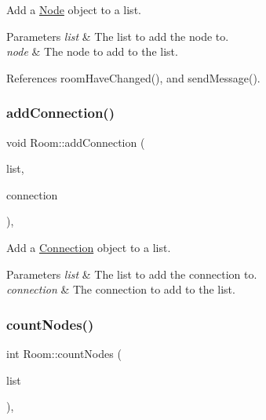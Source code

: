 Add a \mbox{\hyperlink{classNode}{Node}} object to a list. 


\begin{DoxyParams}{Parameters}
{\em list} & The list to add the node to. \\
\hline
{\em node} & The node to add to the list. \\
\hline
\end{DoxyParams}


References room\+Have\+Changed(), and send\+Message().

\mbox{\label{classRoom_a2ebf6e0a7870458f767a15a458e7e033}} 
\subsubsection{\texorpdfstring{add\+Connection()}{addConnection()}}
{\footnotesize\ttfamily void Room\+::add\+Connection (\begin{DoxyParamCaption}\item[{Q\+Qml\+List\+Property$<$ \mbox{\hyperlink{classConnection}{Connection}} $>$ $\ast$}]{list,  }\item[{\mbox{\hyperlink{classConnection}{Connection}} $\ast$}]{connection }\end{DoxyParamCaption})\hspace{0.3cm}{\ttfamily [static]}, {\ttfamily [private]}}



Add a \mbox{\hyperlink{classConnection}{Connection}} object to a list. 


\begin{DoxyParams}{Parameters}
{\em list} & The list to add the connection to. \\
\hline
{\em connection} & The connection to add to the list. \\
\hline
\end{DoxyParams}
\mbox{\label{classRoom_a94547b2123257446da232b4a045a09ff}} 
\subsubsection{\texorpdfstring{count\+Nodes()}{countNodes()}}
{\footnotesize\ttfamily int Room\+::count\+Nodes (\begin{DoxyParamCaption}\item[{Q\+Qml\+List\+Property$<$ \mbox{\hyperlink{classNode}{Node}} $>$ $\ast$}]{list }\end{DoxyParamCaption})\hspace{0.3cm}{\ttfamily [static]}, {\ttfamily [private]}}



